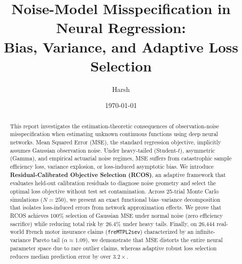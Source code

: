 \documentclass[11pt]{article}
\title{
  Noise-Model Misspecification in Neural Regression:\\
  \Large Bias, Variance, and Adaptive Loss Selection
}
\author{
  \Large Harsh
}
\date{
    \today
}
\numberwithin{figure}{section}
\numberwithin{equation}{section}
\begin{document}
\maketitle

\begin{abstract}
This report investigates the estimation-theoretic consequences of observation-noise misspecification when estimating unknown continuous functions using deep neural networks. Mean Squared Error (MSE), the standard regression objective, implicitly assumes Gaussian observation noise. Under heavy-tailed (Student-$t$), asymmetric (Gamma), and empirical actuarial noise regimes, MSE suffers from catastrophic sample efficiency loss, variance explosion, or loss-induced asymptotic bias. We introduce \textbf{Residual-Calibrated Objective Selection (RCOS)}, an adaptive framework that evaluates held-out calibration residuals to diagnose noise geometry and select the optimal loss objective without test set contamination. Across 25-trial Monte Carlo simulations ($N=250$), we present an exact functional bias--variance decomposition that isolates loss-induced errors from network approximation effects. We prove that RCOS achieves 100\% selection of Gaussian MSE under normal noise (zero efficiency sacrifice) while reducing total risk by 26.4\% under heavy tails. Finally, on 26,444 real-world French motor insurance claims (\texttt{freMTPL2sev}) characterized by an infinite-variance Pareto tail ($\alpha \approx 1.09$), we demonstrate that MSE distorts the entire neural parameter space due to rare outlier claims, whereas adaptive robust loss selection reduces median prediction error by over $3.2\times$.
\end{abstract}

\tableofcontents
\clearpage


\end{document}
